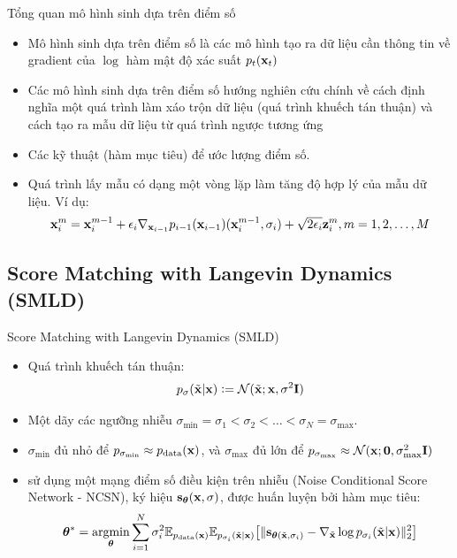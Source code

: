\documentclass[10pt]{beamer}
\theoremstyle{remark}
\numberwithin{algocf}{section}
\numberwithin{equation}{section}
\numberwithin{dl}{section}
\numberwithin{figure}{section}
\begin{document}
\begin{frame}{Tổng quan mô hình sinh dựa trên điểm số}
	\begin{itemize}
		\item Mô hình sinh dựa trên điểm số là các mô hình tạo ra dữ liệu cần thông tin về gradient của $\log$ hàm mật độ xác suất $p_t(\bold{x}_t)$
		\item Các mô hình sinh dựa trên điểm số hướng nghiên cứu chính về cách định nghĩa một quá trình làm xáo trộn dữ liệu (quá trình khuếch tán thuận) và cách tạo ra mẫu dữ liệu từ quá trình ngược tương ứng
		\item Các kỹ thuật (hàm mục tiêu) để ước lượng điểm số.
		\item Quá trình lấy mẫu có dạng một vòng lặp làm tăng độ hợp lý của mẫu dữ liệu. Ví dụ:
		\begin{equation*}
			\bold{x}_i^m = \bold{x}_i^{m-1} + \epsilon_i \nabla_{\bold{x}_{i-1}} p_{i-1}(\bold{x}_{i-1}) (\bold{x}_i^{m-1}, \sigma_i) + \sqrt{2 \epsilon_i} \bold{z}_i^m, m = 1, 2, \dots, M
		\end{equation*}
	\end{itemize}
\end{frame}

\subsection{Score Matching with Langevin Dynamics (SMLD)}

\begin{frame}{Score Matching with Langevin Dynamics (SMLD)}
    \begin{itemize}
		\item Quá trình khuếch tán thuận:
		\begin{equation*}
			p_{\sigma}(\tilde{\bold{x}} \vert \bold{x}) \vcentcolon = \mathcal{N}(\tilde{\bold{x}};\bold{x}, \sigma^2 \bold{I})
		\end{equation*}
		\item Một dãy các ngưỡng nhiễu $\sigma_{\min} = \sigma_1 < \sigma_2 < \dots < \sigma_N = \sigma_{\max}$.
		\item $\sigma_{\min}$ đủ nhỏ để $p_{\sigma_{\min}} \approx p_{\mathrm{data}}(\bold{x})$, và $\sigma_{\max}$ đủ lớn để $p_{\sigma_{\max}}\approx \mathcal{N}(\bold{x}; \bold{0}, \sigma_{\max}^2 \bold{I})$
		\item \citep{song2019generative} sử dụng một mạng điểm số điều kiện trên nhiễu (Noise Conditional Score Network - NCSN), ký hiệu $\bold{s}_{\boldsymbol{\theta}}(\bold{x}, \sigma)$, được huấn luyện bởi hàm mục tiêu:
		\begin{equation} \label{eq:1}
			\boldsymbol{\theta}^{\ast} = \underset{\boldsymbol{\theta}}{\mathrm{argmin}} \sum_{i=1}^N \sigma_i^2 \mathbb{E}_{p_{\mathrm{data}}(\bold{x})} \mathbb{E}_{p_{\sigma_i}(\tilde{\bold{x}} \vert \bold{x})} \big\lbrack \lVert \bold{s}_{\boldsymbol{\theta} (\tilde{\bold{x}}, \sigma_i)} - \nabla_{\tilde{\bold{x}}} \log p_{\sigma_i} (\tilde{\bold{x}} \vert \bold{x})  \rVert_2^2 \big\rbrack
		\end{equation}
	\end{itemize}
\end{frame}
\end{document}
